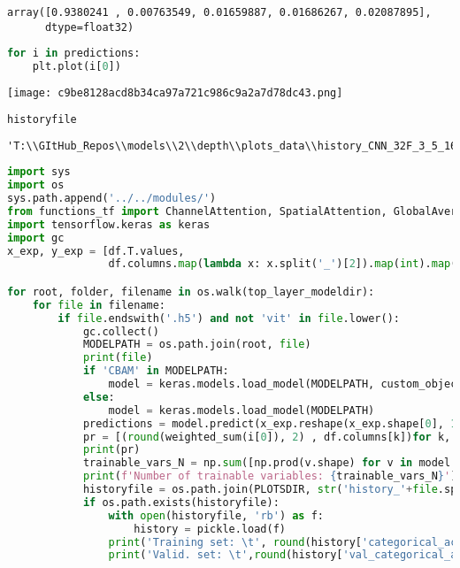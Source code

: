 \begin{lstlisting}
array([0.9380241 , 0.00763549, 0.01659887, 0.01686267, 0.02087895],
      dtype=float32)
\end{lstlisting}

\begin{lstlisting}[language=Python]
for i in predictions:
    plt.plot(i[0])
\end{lstlisting}

\texttt{[image: c9be8128acd8b34ca97a721c986c9a2a7d78dc43.png]}

\begin{lstlisting}[language=Python]
historyfile
\end{lstlisting}

\begin{lstlisting}
'T:\\GItHub_Repos\\models\\2\\depth\\plots_data\\history_CNN_32F_3_5_16F_17_27_47_DCT_8F_.pkl'
\end{lstlisting}

\begin{lstlisting}[language=Python]
import sys
import os
sys.path.append('../../modules/')
from functions_tf import ChannelAttention, SpatialAttention, GlobalAveragePooling1D
import tensorflow.keras as keras
import gc
x_exp, y_exp = [df.T.values,
                df.columns.map(lambda x: x.split('_')[2]).map(int).map(angstrom_to_label)]

for root, folder, filename in os.walk(top_layer_modeldir):
    for file in filename:
        if file.endswith('.h5') and not 'vit' in file.lower():
            gc.collect()
            MODELPATH = os.path.join(root, file)
            print(file)
            if 'CBAM' in MODELPATH:
                model = keras.models.load_model(MODELPATH, custom_objects={'ChannelAttention': ChannelAttention, 'SpatialAttention': SpatialAttention, 'CBAM': functions_tf.CBAM})
            else:
                model = keras.models.load_model(MODELPATH)
            predictions = model.predict(x_exp.reshape(x_exp.shape[0], 1, 1024))
            pr = [(round(weighted_sum(i[0]), 2) , df.columns[k])for k, i in enumerate(predictions)]
            print(pr)
            trainable_vars_N = np.sum([np.prod(v.shape) for v in model.trainable_variables])
            print(f'Number of trainable variables: {trainable_vars_N}')
            historyfile = os.path.join(PLOTSDIR, str('history_'+file.split('.')[0]+'.pkl'))
            if os.path.exists(historyfile):
                with open(historyfile, 'rb') as f:
                    history = pickle.load(f)
                print('Training set: \t', round(history['categorical_accuracy'][-1]*100, 2), '%')
                print('Valid. set: \t',round(history['val_categorical_accuracy'][-1]*100, 2), '%')
\end{lstlisting}


